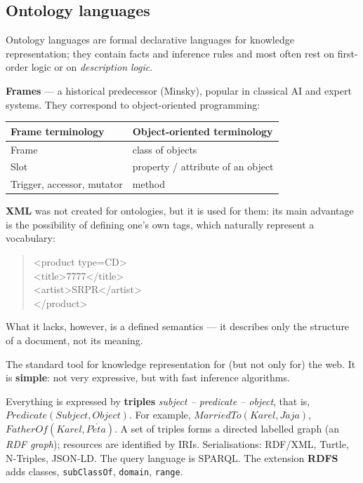 \documentclass[11pt,a4paper]{article}
\theoremstyle{definition}
\begin{document}
\subsection{Ontology languages}

Ontology languages are formal declarative languages for knowledge representation; they contain facts
and inference rules and most often rest on first-order logic or on \emph{description logic}.

\textbf{Frames} --- a historical predecessor (Minsky), popular in classical AI and expert systems.
They correspond to object-oriented programming:

\begin{center}\small
\begin{tabular}{ll}
\toprule
\textbf{Frame terminology} & \textbf{Object-oriented terminology} \\
\midrule
Frame & class of objects \\
Slot & property / attribute of an object \\
Trigger, accessor, mutator & method \\
\bottomrule
\end{tabular}
\end{center}

\textbf{XML} was not created for ontologies, but it is used for them: its main advantage is the
possibility of defining one's own tags, which naturally represent a vocabulary:
\begin{quote}\small\ttfamily
<product type=\textquotedbl CD\textquotedbl>\\
\hspace*{1em}<title>7777</title>\\
\hspace*{1em}<artist>SRPR</artist>\\
</product>
\end{quote}
What it lacks, however, is a defined semantics --- it describes only the structure of a document, not
its meaning.

\begin{defbox}
The standard tool for knowledge representation for (but not only for) the web. It is
\textbf{simple}: not very expressive, but with fast inference algorithms.

Everything is expressed by \textbf{triples} \emph{subject -- predicate -- object}, that is,
$\mathit{Predicate}(\mathit{Subject},\mathit{Object})$. For example,
$\mathit{MarriedTo}(\mathit{Karel},\mathit{J\acute{a}ja})$,
$\mathit{FatherOf}(\mathit{Karel},\mathit{P\acute{e}\check{t}a})$.
A set of triples forms a directed labelled graph (an \emph{RDF graph}); resources are identified by
IRIs. Serialisations: RDF/XML, Turtle, N-Triples, JSON-LD. The query language is SPARQL.
The extension \textbf{RDFS} adds classes, \texttt{subClassOf}, \texttt{domain}, \texttt{range}.
\end{defbox}
\end{document}
